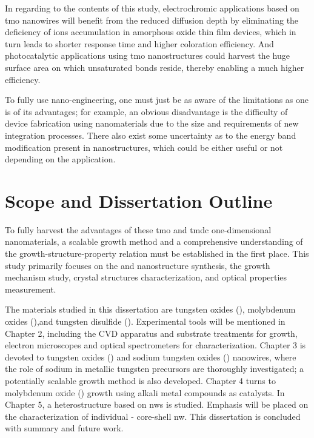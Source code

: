 In regarding to the contents of this study, electrochromic applications based on \gls{tmo} nanowires will benefit from the reduced diffusion depth by eliminating the deficiency of ions accumulation in amorphous oxide thin film devices, which in turn leads to shorter response time and higher coloration efficiency.\cite{Huang2008a,Scherer2012} And photocatalytic applications using \gls{tmo} nanostructures could harvest the huge surface area on which unsaturated bonds reside, thereby enabling a much higher efficiency.\cite{Mills1993,Merki2011,Chen2011b}

To fully use nano-engineering, one must just be as aware of the limitations as one is of its advantages; for example, an obvious disadvantage is the difficulty of device fabrication using nanomaterials due to the size and requirements of new integration processes. There also exist some uncertainty as to the energy band modification present in nanostructures, which could be either useful or not depending on the application.\cite{Wang2012}

\section{Scope and Dissertation Outline}
To fully harvest the advantages of these \gls{tmo} and \gls{tmdc} one-dimensional nanomaterials, a scalable growth method and a comprehensive understanding of the growth-structure-property relation must be established in the first place. This study primarily focuses on the  and  nanostructure synthesis, the growth mechanism study, crystal structures characterization, and optical properties measurement.

The materials studied in this dissertation are tungsten oxides (), molybdenum oxides (),and tungsten disulfide (). Experimental tools will be mentioned in Chapter 2, including the CVD apparatus and substrate treatments for growth, electron microscopes and optical spectrometers for characterization. Chapter 3 is devoted to tungsten oxides () and sodium tungsten oxides () nanowires, where the role of sodium in metallic tungsten precursors are thoroughly investigated; a potentially scalable growth method is also developed. Chapter 4 turns to molybdenum oxide () growth using alkali metal compounds as catalysts. In Chapter 5, a heterostructure based on  \glspl{nw} is studied. Emphasis will be placed on the characterization of individual - core-shell \gls{nw}. This dissertation is concluded with summary and future work. 
